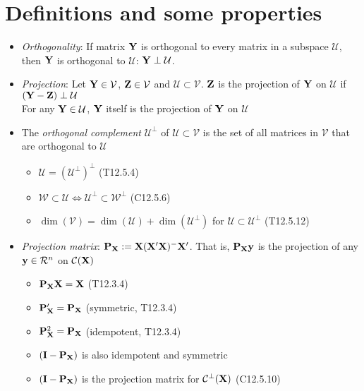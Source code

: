\documentclass[a4paper, oneside]{book}
\begin{document}
\section*{Definitions and some properties}

\begin{itemize}
\item \textit{Orthogonality}: If matrix $\mathbf{Y}$ is orthogonal to every matrix in a subspace $\mathcal{U}$, then $\mathbf{Y}$ is orthogonal to $\mathcal{U}$: $\mathbf{Y} \perp \mathcal{U}$.
\item \textit{Projection}: Let $\mathbf{Y} \in \mathcal{V}$, $\mathbf{Z}\in\mathcal{V}$ and $\mathcal{U} \subset \mathcal{V}$. $\mathbf{Z}$ is the projection of $\mathbf{Y}$ on $\mathcal{U}$ if $(\mathbf{Y-Z}) \perp \mathcal{U}$\\\hspace*{1.75cm} For any $\mathbf{Y} \in \mathcal{U}$, $\mathbf{Y}$ itself is the projection of $\mathbf{Y}$ on $\mathcal{U}$
\item The \textit{orthogonal complement} $\mathcal{U}^\perp$ of $\mathcal{U} \subset \mathcal{V}$ is the set of all matrices in $\mathcal{V}$ that are orthogonal to $\mathcal{U}$ 
	\begin{itemize}
	\item $\mathcal{U} = (\mathcal{U}^\perp)^\perp$ (T12.5.4)
	\item $\mathcal{W}\subset \mathcal{U} \iff \mathcal{U}^\perp \subset \mathcal{W}^\perp$ (C12.5.6)
	\item $\dim(\mathcal{V})=\dim(\mathcal{U})+\dim(\mathcal{U}^\perp)$ for $\mathcal{U}\subset \mathcal{U}^\perp$ (T12.5.12)
	\end{itemize}
	\item \textit{Projection matrix}: $\mathbf{P_{X}}:=\mathbf{X(X'X)^-X'}$. That is, $\mathbf{P}_{\mathbf{X}}\mathbf{y}$ is the projection of any $\mathbf{y} \in \mathcal{R}^n$ on $\mathcal{C}(\mathbf{X})$
	\begin{itemize}
	\item $\mathbf{P}_\mathbf{X}\mathbf{X}=\mathbf{X}$ (T12.3.4)
	\item $\mathbf{P}_\mathbf{X}' = \mathbf{P}_\mathbf{X}$ (\ie symmetric, T12.3.4)
	\item $\mathbf{P}_\mathbf{X}^2 = \mathbf{P}_\mathbf{X}$ (\ie idempotent, T12.3.4)
	\item $(\mathbf{I-P}_\mathbf{X})$ is also idempotent and symmetric
	\item $(\mathbf{I-P}_\mathbf{X})$ is the projection matrix for $\mathcal{C}^\perp(\mathbf{X})$ (C12.5.10)
	\end{itemize}
\end{itemize}
\end{document}
